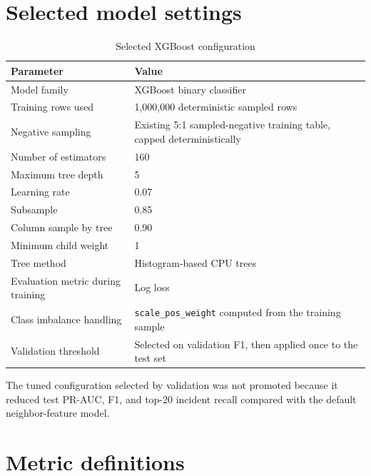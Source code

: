 \section{Selected model settings}

\begin{table}[H]
\centering
\caption{Selected XGBoost configuration}
\label{tab:appendix_xgboost_settings}
\small
\begin{tabularx}{\textwidth}{L{0.34\textwidth}Y}
\toprule
\textbf{Parameter} & \textbf{Value} \\
\midrule
Model family & XGBoost binary classifier \\
Training rows used & 1,000,000 deterministic sampled rows \\
Negative sampling & Existing 5:1 sampled-negative training table, capped deterministically \\
Number of estimators & 160 \\
Maximum tree depth & 5 \\
Learning rate & 0.07 \\
Subsample & 0.85 \\
Column sample by tree & 0.90 \\
Minimum child weight & 1 \\
Tree method & Histogram-based CPU trees \\
Evaluation metric during training & Log loss \\
Class imbalance handling & \texttt{scale\_pos\_weight} computed from the training sample \\
Validation threshold & Selected on validation F1, then applied once to the test set \\
\bottomrule
\end{tabularx}
\end{table}

The tuned configuration selected by validation was not promoted because it reduced test PR-AUC, F1, and top-20 incident recall compared with the default neighbor-feature model.

\section{Metric definitions}

